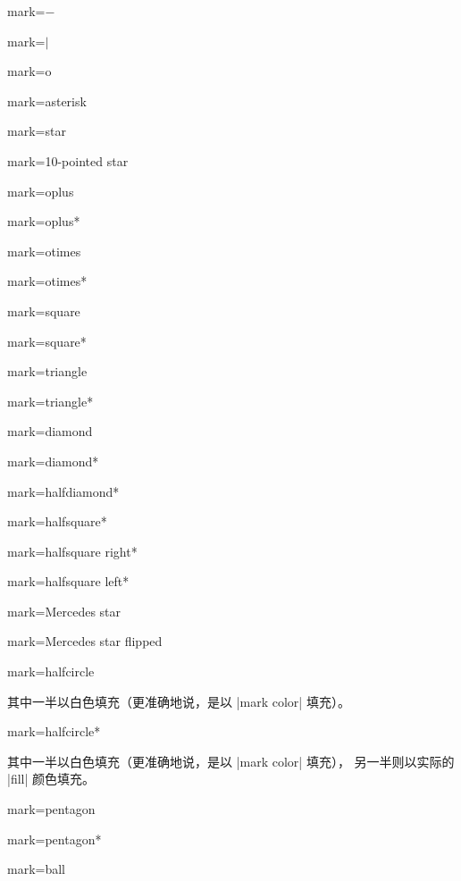\begin{longdescription}
    \item[mark=$-$] 
    \item[mark=$\vert$] 
    \item[mark=o] 
    \item[mark=asterisk] 
    \item[mark=star] 
    \item[mark=10-pointed star] 
    \item[mark=oplus] 
    \item[mark=oplus*] 
    \item[mark=otimes] 
    \item[mark=otimes*] 
    \item[mark=square] 
    \item[mark=square*] 
    \item[mark=triangle] 
    \item[mark=triangle*] 
    \item[mark=diamond] 
    \item[mark=diamond*] 
    \item[mark=halfdiamond*] 
    \item[mark=halfsquare*] 
    \item[mark=halfsquare right*] 
    \item[mark=halfsquare left*] 
    \item[mark=Mercedes star] 
    \item[mark=Mercedes star flipped] 
    \item[mark=halfcircle] 

        其中一半以白色填充（更准确地说，是以 |mark color| 填充）。

    \item[mark=halfcircle*] 

        其中一半以白色填充（更准确地说，是以 |mark color| 填充），
        另一半则以实际的 |fill| 颜色填充。

    \item[mark=pentagon] 
    \item[mark=pentagon*] 
    \item[mark=ball] 


\end{longdescription}
